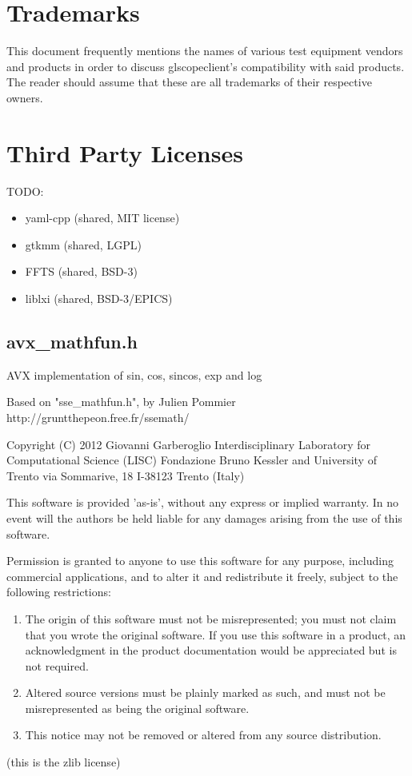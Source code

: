 \section{Trademarks}

This document frequently mentions the names of various test equipment vendors and products in order to discuss
glscopeclient's compatibility with said products. The reader should assume that these are all trademarks of their
respective owners.

\section{Third Party Licenses}

TODO:
\begin{itemize}
\item yaml-cpp (shared, MIT license)
\item gtkmm (shared, LGPL)
\item FFTS (shared, BSD-3)
\item liblxi (shared, BSD-3/EPICS)
\end{itemize}

\subsection{avx\_mathfun.h}

AVX implementation of sin, cos, sincos, exp and log

Based on "sse\_mathfun.h", by Julien Pommier
http://gruntthepeon.free.fr/ssemath/

Copyright (C) 2012 Giovanni Garberoglio
Interdisciplinary Laboratory for Computational Science (LISC)
Fondazione Bruno Kessler and University of Trento
via Sommarive, 18
I-38123 Trento (Italy)

This software is provided 'as-is', without any express or implied
warranty.  In no event will the authors be held liable for any damages
arising from the use of this software.

Permission is granted to anyone to use this software for any purpose,
including commercial applications, and to alter it and redistribute it
freely, subject to the following restrictions:

\begin{enumerate}
\item The origin of this software must not be misrepresented; you must not
claim that you wrote the original software. If you use this software
in a product, an acknowledgment in the product documentation would be
appreciated but is not required.
\item Altered source versions must be plainly marked as such, and must not be
misrepresented as being the original software.
\item This notice may not be removed or altered from any source distribution.
\end{enumerate}

(this is the zlib license)
